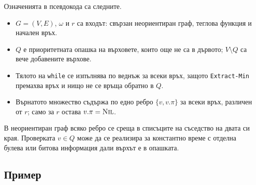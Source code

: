 Означенията в псевдокода са следните.

\begin{itemize}
\item $G=(V,E)$, $\omega$ и $r$ са входът: свързан неориентиран граф, теглова функция и начален връх.
\item $Q$ е приоритетната опашка на върховете, които още не са в дървото; $V\setminus Q$ са вече добавените върхове.
\item Тялото на \verb|while| се изпълнява по веднъж за всеки връх, защото \verb|Extract-Min| премахва връх и нищо не се връща обратно в $Q$.
\item Върнатото множество съдържа по едно ребро $\{v,v.\pi\}$ за всеки връх, различен от $r$; само за $r$ остава $v.\pi=\textsc{Nil}$.
\end{itemize}

В неориентиран граф всяко ребро се среща в списъците на съседство на двата си края. Проверката $v\in Q$ може да се реализира за константно време с отделна булева или битова информация дали върхът е в опашката.

\subsection{Пример}\label{s:7.3.4}

